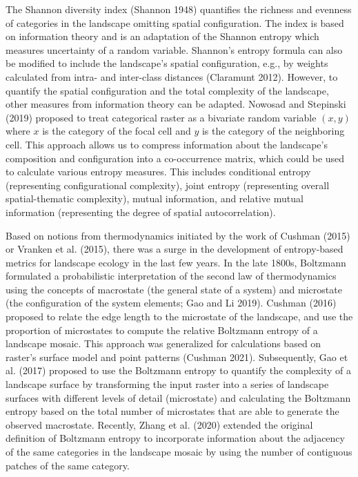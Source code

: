 \documentclass[
  10pt,
  a4paperpaper,
]{article}
\begin{document}
The Shannon diversity index (Shannon 1948) quantifies the richness and
evenness of categories in the landscape omitting spatial configuration.
The index is based on information theory and is an adaptation of the
Shannon entropy which measures uncertainty of a random variable.
Shannon's entropy formula can also be modified to include the
landscape's spatial configuration, e.g., by weights calculated from
intra- and inter-class distances (Claramunt 2012). However, to quantify
the spatial configuration and the total complexity of the landscape,
other measures from information theory can be adapted. Nowosad and
Stepinski (2019) proposed to treat categorical raster as a bivariate
random variable \((x,y)\) where \(x\) is the category of the focal cell
and \(y\) is the category of the neighboring cell. This approach allows
us to compress information about the landscape's composition and
configuration into a co-occurrence matrix, which could be used to
calculate various entropy measures. This includes conditional entropy
(representing configurational complexity), joint entropy (representing
overall spatial-thematic complexity), mutual information, and relative
mutual information (representing the degree of spatial autocorrelation).

Based on notions from thermodynamics initiated by the work of Cushman
(2015) or Vranken et al. (2015), there was a surge in the development of
entropy-based metrics for landscape ecology in the last few years. In
the late 1800s, Boltzmann formulated a probabilistic interpretation of
the second law of thermodynamics using the concepts of macrostate (the
general state of a system) and microstate (the configuration of the
system elements; Gao and Li 2019). Cushman (2016) proposed to relate the
edge length to the microstate of the landscape, and use the proportion
of microstates to compute the relative Boltzmann entropy of a landscape
mosaic. This approach was generalized for calculations based on raster's
surface model and point patterns (Cushman 2021). Subsequently, Gao et
al. (2017) proposed to use the Boltzmann entropy to quantify the
complexity of a landscape surface by transforming the input raster into
a series of landscape surfaces with different levels of detail
(microstate) and calculating the Boltzmann entropy based on the total
number of microstates that are able to generate the observed macrostate.
Recently, Zhang et al. (2020) extended the original definition of
Boltzmann entropy to incorporate information about the adjacency of the
same categories in the landscape mosaic by using the number of
contiguous patches of the same category.
\end{document}
